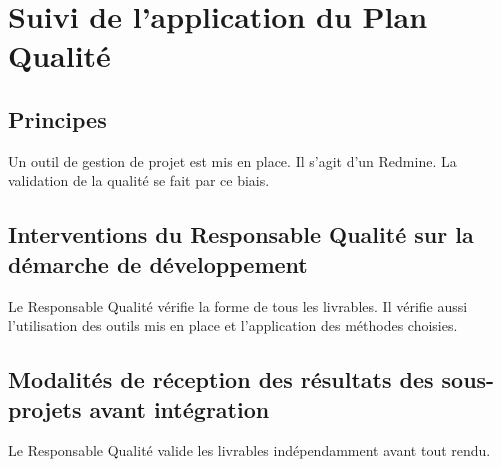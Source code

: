 \section{Suivi de l'application du Plan Qualité}

\subsection{Principes}
Un outil de gestion de projet est mis en place. Il s'agit d'un Redmine.
La validation de la qualité se fait par ce biais.

\subsection{Interventions du Responsable Qualité sur la démarche de développement}
Le Responsable Qualité vérifie la forme de tous les livrables. Il vérifie aussi l'utilisation des outils mis en place
et l'application des méthodes choisies.

\subsection{Modalités de réception des résultats des sous-projets avant intégration}
Le Responsable Qualité valide les livrables indépendamment avant tout rendu.

\vfill
\pagebreak
